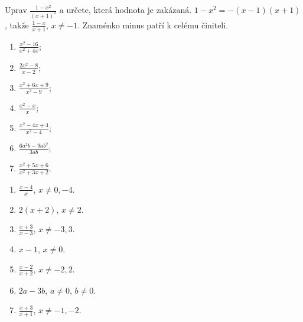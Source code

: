 \documentclass[11pt,a4paper]{article}
\begin{document}
\begin{zadaniReseniBox}[breakable=false,title={Rozšíření 1}]
Uprav $\displaystyle\frac{1-x^2}{(x+1)^2}$ a určete, která hodnota je zakázaná.
\tcblower
$1-x^2=-(x-1)(x+1)$, takže $\frac{1-x}{x+1}$, $x\ne-1$. Znaménko minus patří k celému činiteli.
\end{zadaniReseniBox}
\begin{zadaniReseniBox}[breakable=false,title={Domácí úkol}]
\begin{enumerate}[label=\alph*)]
\item $\frac{x^2-16}{x^2+4x}$;
\item $\frac{2x^2-8}{x-2}$;
\item $\frac{x^2+6x+9}{x^2-9}$;
\item $\frac{x^2-x}{x}$;
\item $\frac{x^2-4x+4}{x^2-4}$;
\item $\frac{6a^2b-9ab^2}{3ab}$;
\item $\frac{x^2+5x+6}{x^2+3x+2}$.
\end{enumerate}
\tcblower
\begin{enumerate}[label=\alph*)]
\item $\frac{x-4}{x}$, $x\ne0,-4$.
\item $2(x+2)$, $x\ne2$.
\item $\frac{x+3}{x-3}$, $x\ne-3,3$.
\item $x-1$, $x\ne0$.
\item $\frac{x-2}{x+2}$, $x\ne-2,2$.
\item $2a-3b$, $a\ne0$, $b\ne0$.
\item $\frac{x+3}{x+1}$, $x\ne-1,-2$.
\end{enumerate}
\end{zadaniReseniBox}
\end{document}
